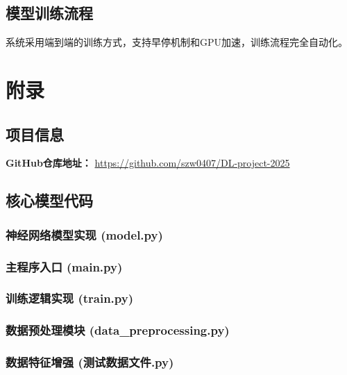 \documentclass{article}
\begin{document}
\subsection{模型训练流程}
系统采用端到端的训练方式，支持早停机制和GPU加速，训练流程完全自动化。

\appendix
\section{附录}

\subsection{项目信息}
\textbf{GitHub仓库地址：} \url{https://github.com/szw0407/DL-project-2025}

\subsection{核心模型代码}
\subsubsection{神经网络模型实现 (model.py)}


\subsubsection{主程序入口 (main.py)}


\subsubsection{训练逻辑实现 (train.py)}


\subsubsection{数据预处理模块 (data\_preprocessing.py)}


\subsubsection{数据特征增强 (测试数据文件.py)}

\end{document}
